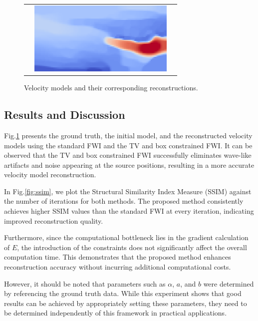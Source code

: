 \begin{figure}[htbp]
\begin{tabular}{m{68mm} m{70mm} m{10mm}}
\begin{minipage}[b]{70mm}
            \caption*{Initial model}
        \end{minipage} &
        \begin{minipage}[b]{70mm}
            \centering
            \includegraphics[width=70mm]{public/pds}
            \caption*{Reconstructed with the constrained FWI}
        \end{minipage} &
    \end{tabular}
    \caption{Velocity models and their corresponding reconstructions.}
    \label{fig:velocity-models}
\end{figure}



\subsection{Results and Discussion}\label{subsec:results-and-discussion}

Fig.\ref{fig:velocity-models} presents the ground truth, the initial model, and the reconstructed velocity models using the standard FWI and the TV and box constrained FWI.
It can be observed that the TV and box constrained FWI successfully eliminates wave-like artifacts and noise appearing at the source positions, resulting in a more accurate velocity model reconstruction.

In Fig.\ref{fig:ssim}, we plot the Structural Similarity Index Measure (SSIM) against the number of iterations for both methods.
The proposed method consistently achieves higher SSIM values than the standard FWI at every iteration, indicating improved reconstruction quality.

Furthermore, since the computational bottleneck lies in the gradient calculation of $E$, the introduction of the constraints does not significantly affect the overall computation time.
This demonstrates that the proposed method enhances reconstruction accuracy without incurring additional computational costs.

However, it should be noted that parameters such as $\alpha$, $a$, and $b$ were determined by referencing the ground truth data.
While this experiment shows that good results can be achieved by appropriately setting these parameters, they need to be determined independently of this framework in practical applications.


